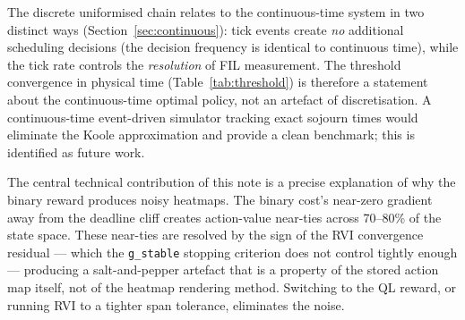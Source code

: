 \documentclass[11pt,a4paper]{article}
\begin{document}
The discrete uniformised chain relates to the continuous-time system in two
distinct ways (Section~\ref{sec:continuous}): tick events create \emph{no}
additional scheduling decisions (the decision frequency is identical to
continuous time), while the tick rate controls the \emph{resolution} of FIL
measurement.  The threshold convergence in physical time
(Table~\ref{tab:threshold}) is therefore a statement about the continuous-time
optimal policy, not an artefact of discretisation.  A continuous-time
event-driven simulator tracking exact sojourn times would eliminate the Koole
approximation and provide a clean benchmark; this is identified as future work.

The central technical contribution of this note is a precise explanation of
why the binary reward produces noisy heatmaps.  The binary cost's near-zero
gradient away from the deadline cliff creates action-value near-ties across
70--80\% of the state space.  These near-ties are resolved by the sign of the
RVI convergence residual --- which the \texttt{g\_stable} stopping criterion
does not control tightly enough --- producing a salt-and-pepper artefact that
is a property of the stored action map itself, not of the heatmap rendering
method.  Switching to the QL reward, or running RVI to a tighter span
tolerance, eliminates the noise.
\end{document}
